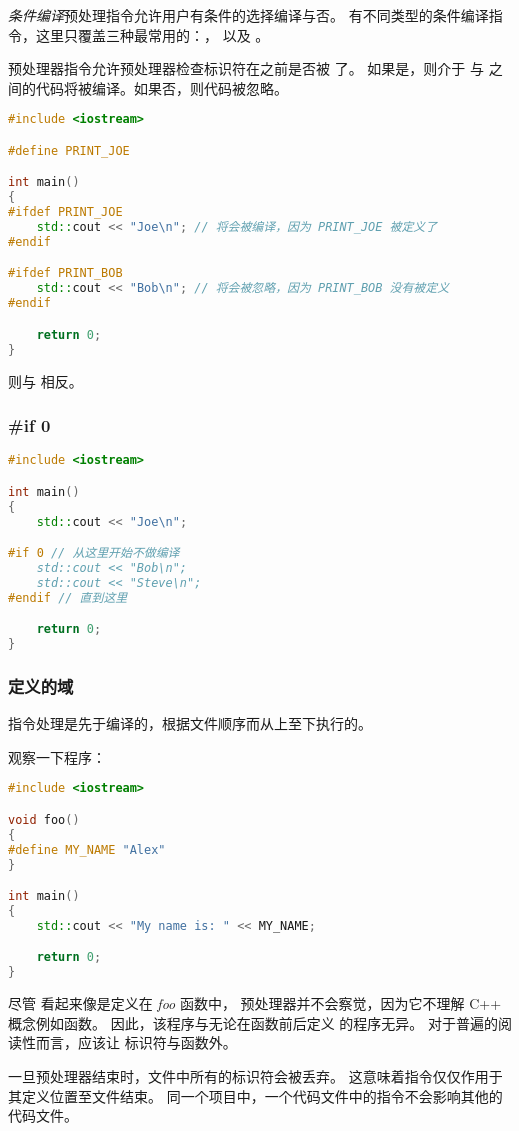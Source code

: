 \documentclass[../../LearnCpp.tex]{subfiles}
\begin{document}
\textit{条件编译}预处理指令允许用户有条件的选择编译与否。
有不同类型的条件编译指令，这里只覆盖三种最常用的：， 以及 。

 预处理器指令允许预处理器检查标识符在之前是否被  了。
如果是，则介于  与  之间的代码将被编译。如果否，则代码被忽略。

\begin{lstlisting}[language=C++]
#include <iostream>

#define PRINT_JOE

int main()
{
#ifdef PRINT_JOE
    std::cout << "Joe\n"; // 将会被编译，因为 PRINT_JOE 被定义了
#endif

#ifdef PRINT_BOB
    std::cout << "Bob\n"; // 将会被忽略，因为 PRINT_BOB 没有被定义
#endif

    return 0;
}
\end{lstlisting}

 则与  相反。

\subsubsection*{\#if 0}

\begin{lstlisting}[language=C++]
#include <iostream>

int main()
{
    std::cout << "Joe\n";

#if 0 // 从这里开始不做编译
    std::cout << "Bob\n";
    std::cout << "Steve\n";
#endif // 直到这里

    return 0;
}
\end{lstlisting}

\subsubsection*{定义的域}

指令处理是先于编译的，根据文件顺序而从上至下执行的。

观察一下程序：

\begin{lstlisting}[language=C++]
#include <iostream>

void foo()
{
#define MY_NAME "Alex"
}

int main()
{
    std::cout << "My name is: " << MY_NAME;

    return 0;
}
\end{lstlisting}

尽管  看起来像是定义在 \textit{foo} 函数中，
预处理器并不会察觉，因为它不理解 C++ 概念例如函数。
因此，该程序与无论在函数前后定义  的程序无异。
对于普遍的阅读性而言，应该让  标识符与函数外。

一旦预处理器结束时，文件中所有的标识符会被丢弃。
这意味着指令仅仅作用于其定义位置至文件结束。
同一个项目中，一个代码文件中的指令不会影响其他的代码文件。
\end{document}
